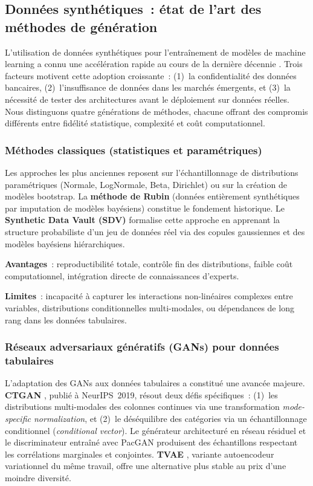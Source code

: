 \documentclass[12pt, a4paper, twocolumn]{article}
\begin{document}
\subsection{Données synthétiques~: état de l'art des méthodes de génération}
\label{subsec:synth}

L'utilisation de données synthétiques pour l'entraînement de modèles de machine learning a connu une accélération rapide au cours de la dernière décennie \cite{bauer2024, lu2023}. Trois facteurs motivent cette adoption croissante~: (1)~la confidentialité des données bancaires, (2)~l'insuffisance de données dans les marchés émergents, et (3)~la nécessité de tester des architectures avant le déploiement sur données réelles. Nous distinguons quatre générations de méthodes, chacune offrant des compromis différents entre fidélité statistique, complexité et coût computationnel.

\subsubsection{Méthodes classiques (statistiques et paramétriques)}
\label{subsubsec:synth_classique}

Les approches les plus anciennes reposent sur l'échantillonnage de distributions paramétriques (Normale, LogNormale, Beta, Dirichlet) ou sur la création de modèles bootstrap. La \textbf{méthode de Rubin} \cite{rubin1993} (données entièrement synthétiques par imputation de modèles bayésiens) constitue le fondement historique. Le \textbf{Synthetic Data Vault (SDV)} \cite{patki2016} formalise cette approche en apprenant la structure probabiliste d'un jeu de données réel via des copules gaussiennes et des modèles bayésiens hiérarchiques.

\textbf{Avantages}~: reproductibilité totale, contrôle fin des distributions, faible coût computationnel, intégration directe de connaissances d'experts.

\textbf{Limites}~: incapacité à capturer les interactions non-linéaires complexes entre variables, distributions conditionnelles multi-modales, ou dépendances de long rang dans les données tabulaires.

\subsubsection{Réseaux adversariaux génératifs (GANs) pour données tabulaires}
\label{subsubsec:synth_gan}

L'adaptation des GANs \cite{goodfellow2014} aux données tabulaires a constitué une avancée majeure. \textbf{CTGAN} \cite{xu2019ctgan}, publié à NeurIPS~2019, résout deux défis spécifiques~: (1)~les distributions multi-modales des colonnes continues via une transformation \textit{mode-specific normalization}, et (2)~le déséquilibre des catégories via un échantillonnage conditionnel (\textit{conditional vector}). Le générateur architecturé en réseau résiduel et le discriminateur entraîné avec PacGAN produisent des échantillons respectant les corrélations marginales et conjointes. \textbf{TVAE} \cite{xu2019ctgan}, variante autoencodeur variationnel du même travail, offre une alternative plus stable au prix d'une moindre diversité.
\end{document}
